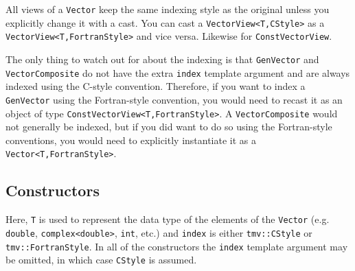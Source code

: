 \documentclass[twoside,letterpaper,11pt]{article}
\renewcommand{\tt}[1]{{\lstinline {#1}}}
\begin{document}
All views of a \tt{Vector} keep the same indexing style as the original unless you
explicitly change it with a cast.  You can cast a \tt{VectorView<T,CStyle>} as
a \tt{VectorView<T,FortranStyle>} and vice versa.  Likewise for
\tt{ConstVectorView}.  

The only thing to watch out for about the indexing is that \tt{GenVector}
and \tt{VectorComposite} do not have the extra \tt{index} 
template argument and are always
indexed using the C-style convention.  Therefore, 
if you want to index a \tt{GenVector}
using the Fortran-style convention, you would need to recast it
as an object of type
\tt{ConstVectorView<T,FortranStyle>}.  A \tt{VectorComposite} would 
not generally be indexed, but if you did want to do so using the 
Fortran-style conventions, you would need to explicitly instantiate it
as a \tt{Vector<T,FortranStyle>}.

\subsection{Constructors}
\label{Vector_Constructors}

Here, \tt{T} is used to represent the data type of the elements of the \tt{Vector}
(e.g. \tt{double}, \tt{complex<double>}, \tt{int}, etc.) and \tt{index} is either
\tt{tmv::CStyle} or \tt{tmv::FortranStyle}.  In all of the constructors the
\tt{index} template argument may be omitted, in which case \tt{CStyle} is assumed.
\end{document}
